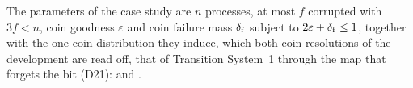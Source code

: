 \begin{definition}
  \label{def:aba-params}
  \leanok
  The parameters of the case study are $n$ processes, at most $f$ corrupted with $3f < n$, coin goodness $\varepsilon$ and coin failure mass $\delta_{\mathrm{f}}$ subject to $2\varepsilon + \delta_{\mathrm{f}} \le 1$, together with the one coin distribution they induce, which both coin resolutions of the development are read off, that of Transition System~1 through the map that forgets the bit (D21):  and .
\end{definition}
